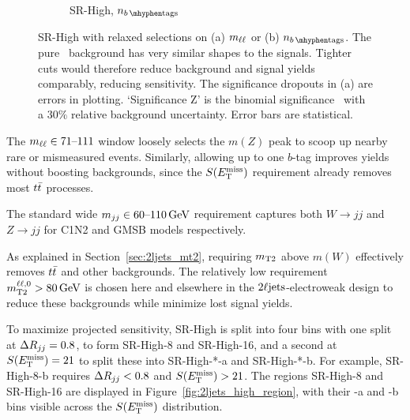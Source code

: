 \begin{figure}[tp]
\begin{subfigure}{0.48\textwidth}
\caption{SR-High, $\nbtag$}
\end{subfigure}
\caption[
SR-High with relaxed selections on (a) $\mll$ or (b) $\nbtag$
]{%
SR-High with relaxed selections on (a) $\mll$ or (b) $\nbtag$.
The pure \diboson\ background has very similar shapes to the signals.
Tighter cuts would therefore reduce background and signal yields comparably,
reducing sensitivity.
The significance dropouts in (a) are errors in plotting.
`Significance Z' is the binomial significance~\cite{cousins2008evaluation}
with a $30\%$ relative background uncertainty.
Error bars are statistical.
}
\label{fig:2ljets_high_mll_b}
\end{figure}

The $\mll \in 71\textrm{--}111$ window loosely selects the $m(Z)$ peak to
scoop up nearby rare or mismeasured events.
Similarly, allowing up to one $b$-tag improves yields without boosting
backgrounds, since the $\metsig$ requirement already removes most $\ttbar$
processes.

The standard wide $\mjj \in 60\textrm{--}110\,\eV[G]$ requirement captures
both $W\rightarrow jj$ and $Z\rightarrow jj$ for C1N2 and GMSB models
respectively.

As explained in Section~\ref{sec:2ljets_mt2}, requiring $\mttwo$ above $m(W)$
effectively removes $\ttbar$ and other backgrounds.
The relatively low requirement $\mttwoll > 80\,\eV[G]$ is chosen here and
elsewhere in the $\twoljets$-electroweak design to reduce these backgrounds
while minimize lost signal yields.

To maximize projected sensitivity, SR-High is split into four bins with
one split at $\rjj = 0.8$, to form SR-High-8 and SR-High-16, and a second at
$\metsig = 21$ to split these into SR-High-*-a and SR-High-*-b.
For example, SR-High-8-b requires $\rjj < 0.8$ and $\metsig > 21$.
The regions SR-High-8 and SR-High-16 are displayed in
Figure~\ref{fig:2ljets_high_region}, with their -a and -b bins visible across
the $\metsig$ distribution.

